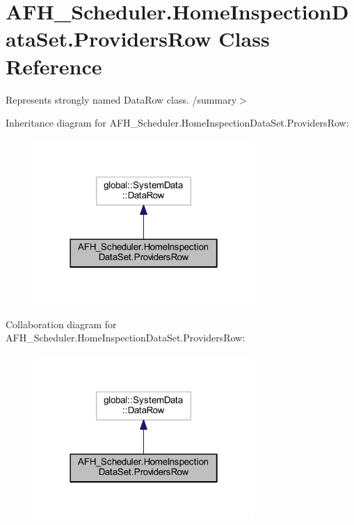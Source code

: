 \section{A\+F\+H\+\_\+\+Scheduler.\+Home\+Inspection\+Data\+Set.\+Providers\+Row Class Reference}
\label{class_a_f_h___scheduler_1_1_home_inspection_data_set_1_1_providers_row}


Represents strongly named Data\+Row class. /summary$>$  




Inheritance diagram for A\+F\+H\+\_\+\+Scheduler.\+Home\+Inspection\+Data\+Set.\+Providers\+Row\+:
\nopagebreak
\begin{figure}[H]
\begin{center}
\leavevmode
\includegraphics[width=238pt]{class_a_f_h___scheduler_1_1_home_inspection_data_set_1_1_providers_row__inherit__graph}
\end{center}
\end{figure}


Collaboration diagram for A\+F\+H\+\_\+\+Scheduler.\+Home\+Inspection\+Data\+Set.\+Providers\+Row\+:
\nopagebreak
\begin{figure}[H]
\begin{center}
\leavevmode
\includegraphics[width=238pt]{class_a_f_h___scheduler_1_1_home_inspection_data_set_1_1_providers_row__coll__graph}
\end{center}
\end{figure}
